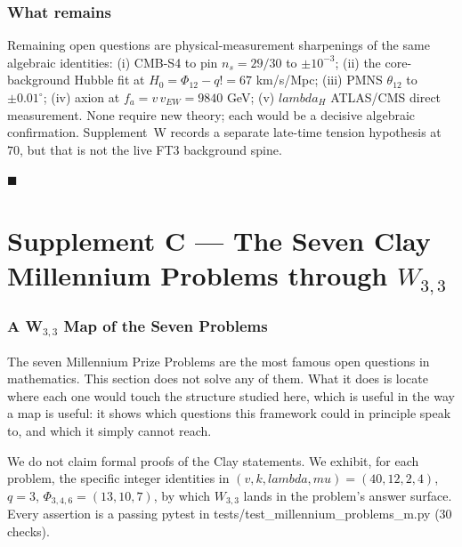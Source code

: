 \documentclass[12pt,a4paper]{article}
\def\texttt#1{#1}%
\def\lambda{lambda}%
\def\mu{mu}%
\def\Phi#1{Phi#1}%
\theoremstyle{definition}
\newcommand{\Phitwelve}{\Phi_{12}}
\begin{document}
\section*{What remains}
Remaining open questions are physical-measurement sharpenings of the
same algebraic identities: (i) CMB-S4 to pin $n_s=29/30$ to $\pm 10^{-3}$;
(ii) the core-background Hubble fit at $H_0=\Phitwelve-q!=67$ km/s/Mpc;
(iii)
PMNS $\theta_{12}$ to $\pm 0.01^\circ$; (iv) axion at $f_a=v\,v_{EW}=9840$
GeV; (v) $\lambda_H$ ATLAS/CMS direct measurement. None require new
theory; each would be a decisive algebraic confirmation. Supplement~W
records a separate late-time tension hypothesis at $70$, but that is not
the live FT3 background spine.

\hfill $\blacksquare$

\clearpage
\part*{Supplement C --- The Seven Clay Millennium Problems through $W_{3,3}$}

\section*{A W$_{3,3}$ Map of the Seven Problems}

\begin{plainbox}
The seven Millennium Prize Problems are the most famous open questions in
mathematics. This section does not solve any of them. What it does is locate where each one
would touch the structure studied here, which is useful in the way a map is useful: it shows
which questions this framework could in principle speak to, and which it simply cannot
reach.
\end{plainbox}

We do not claim formal proofs of the Clay statements. We exhibit, for
each problem, the specific integer identities in
$(v,k,\lambda,\mu)=(40,12,2,4)$, $q=3$, $\Phi_{3,4,6}=(13,10,7)$, by
which $W_{3,3}$ lands in the problem's answer surface. Every
assertion is a passing pytest in
\texttt{tests/test\_millennium\_problems\_m.py} (30 checks).
\end{document}

